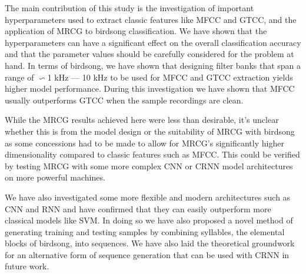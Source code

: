The main contribution of this study is the investigation of important
hyperparameters used to extract classic features like MFCC and GTCC, and the
application of MRCG to birdsong classification. We have shown that the
hyperparameters can have a significant effect on the overall classification
accuracy and that the parameter values should be carefully considered for the
problem at hand. In terms of birdsong, we have shown that designing filter banks
that span a range of $\backsim$1 kHz --- 10 kHz to be used for MFCC and GTCC
extraction yields higher model performance. During this investigation we have
shown that MFCC usually outperforms GTCC when the sample recordings are clean.

While the MRCG results achieved here were less than desirable, it's unclear
whether this is from the model design or the suitability of MRCG with birdsong
as some concessions had to be made to allow for MRCG's significantly higher
dimensionality compared to classic features such as MFCC\@. This could be
verified by testing MRCG with some more complex CNN or CRNN model architectures
on more powerful machines.

We have also investigated some more flexible and modern architectures such as CNN
and RNN and have confirmed that they can easily outperform more classical models
like SVM\@. In doing so we have also proposed a novel method of generating
training and testing samples by combining syllables, the elemental blocks of
birdsong, into sequences. We have also laid the theoretical groundwork for an
alternative form of sequence generation that can be used with CRNN in future work.
